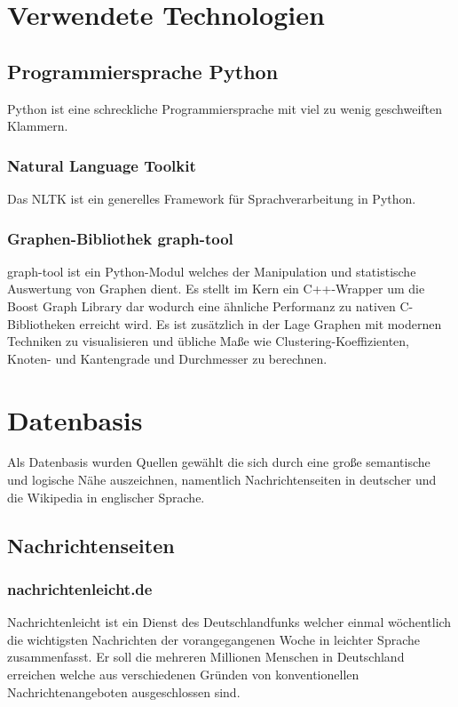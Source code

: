 \documentclass[12pt, a4paper]{article}
\begin{document}
\section{Verwendete Technologien}
\subsection{Programmiersprache Python}

Python ist eine schreckliche Programmiersprache mit viel zu wenig geschweiften
Klammern.

\subsubsection{Natural Language Toolkit}

Das NLTK ist ein generelles Framework f\"ur Sprachverarbeitung in Python.

\subsubsection{Graphen-Bibliothek graph-tool}

graph-tool ist ein Python-Modul welches der Manipulation und statistische
Auswertung von Graphen dient. Es stellt im Kern ein C++-Wrapper um die Boost
Graph Library dar wodurch eine \"ahnliche Performanz zu nativen C-Bibliotheken
erreicht wird. Es ist zus\"atzlich in der Lage Graphen mit modernen Techniken
zu visualisieren und \"ubliche Ma\ss{}e wie Clustering-Koeffizienten, Knoten-
und Kantengrade und Durchmesser zu berechnen.

\section{Datenbasis}

Als Datenbasis wurden Quellen gew\"ahlt die sich durch eine gro\ss{}e
semantische und logische N\"ahe auszeichnen, namentlich Nachrichtenseiten in
deutscher und die Wikipedia in englischer Sprache.

\subsection{Nachrichtenseiten}

\subsubsection{nachrichtenleicht.de}

Nachrichtenleicht ist ein Dienst des Deutschlandfunks welcher einmal
w\"ochentlich die wichtigsten Nachrichten der vorangegangenen Woche in leichter
Sprache zusammenfasst. Er soll die mehreren Millionen Menschen in Deutschland
erreichen welche aus verschiedenen Gr\"unden von konventionellen
Nachrichtenangeboten ausgeschlossen sind.
\end{document}
